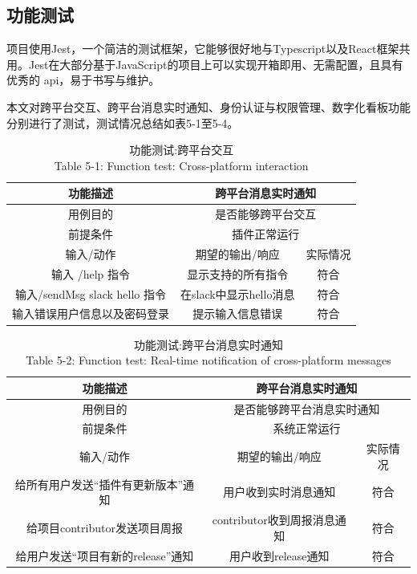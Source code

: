 \subsection{功能测试}
\par 项目使用Jest，一个简洁的测试框架，它能够很好地与Typescript以及React框架共用。Jest在大部分基于JavaScript的项目上可以实现开箱即用、无需配置，且具有优秀的 api，易于书写与维护。
\par 本文对跨平台交互、跨平台消息实时通知、身份认证与权限管理、数字化看板功能分别进行了测试，测试情况总结如表5-1至5-4。

\begin{table}[htbp]\center
    \caption{功能测试:跨平台交互\\ Table 5-1:  Function test: Cross-platform interaction}
    \begin{tabular}{|c|c|c|}
        \hline
        功能描述 & \multicolumn{2}{|c|}{跨平台消息实时通知}\\
        \hline
        用例目的 & \multicolumn{2}{|c|}{是否能够跨平台交互}\\
        \hline
        前提条件 & \multicolumn{2}{|c|}{插件正常运行}\\
        \hline
        输入/动作 & 期望的输出/响应 & 实际情况\\
        \hline
        输入 /help 指令 & 显示支持的所有指令 & 符合 \\
        \hline
        输入/sendMsg slack hello 指令 & 在slack中显示hello消息 & 符合 \\
        \hline
        输入错误用户信息以及密码登录 &提示输入信息错误 & 符合 \\
        \hline
    \end{tabular}
\end{table}
\begin{table}[htbp]\center
    \caption{功能测试:跨平台消息实时通知\\ Table 5-2:  Function test: Real-time notification of cross-platform messages}
    \begin{tabular}{|c|c|c|}
        \hline
        功能描述 & \multicolumn{2}{|c|}{跨平台消息实时通知}\\
        \hline
        用例目的 & \multicolumn{2}{|c|}{是否能够跨平台消息实时通知}\\
        \hline
        前提条件 & \multicolumn{2}{|c|}{系统正常运行}\\
        \hline
        输入/动作 & 期望的输出/响应 & 实际情况\\
        \hline
        给所有用户发送“插件有更新版本”通知 & 用户收到实时消息通知 & 符合 \\
        \hline
        给项目contributor发送项目周报 & contributor收到周报消息通知 & 符合 \\
        \hline
        给用户发送“项目有新的release”通知 & 用户收到release通知 & 符合 \\
        \hline
    \end{tabular}
\end{table}
